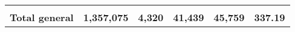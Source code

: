 \begin{tabular}{lrcclr}
	& \multicolumn{1}{l}{}                                           & \multicolumn{1}{l}{}                                       & \multicolumn{1}{l}{} &                                                                     & \multicolumn{1}{l}{}                                                         \\
	\rowcolor[HTML]{DDEBF7} 
	\textbf{Total   general}                                       & \textbf{1,357,075}                                             & \multicolumn{1}{r}{\cellcolor[HTML]{DDEBF7}\textbf{4,320}} & \textbf{41,439}      & \textbf{45,759}                                                     & \textbf{337.19}                                                             
\end{tabular}